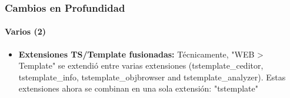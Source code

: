 
\begin{frame}[fragile]
	\frametitle{Cambios en Profundidad}
	\framesubtitle{Varios (2)}

	\begin{itemize}

		\item \textbf{Extensiones TS/Template fusionadas:}\newline
			\small
				Técnicamente, "WEB > Template" se extendió entre varias extensiones (tstemplate\_ceditor, tstemplate\_info,
tstemplate\_objbrowser and tstemplate\_analyzer). Estas extensiones ahora se combinan en una sola extensión: "tstemplate"
			\normalsize

	\end{itemize}

\end{frame}


